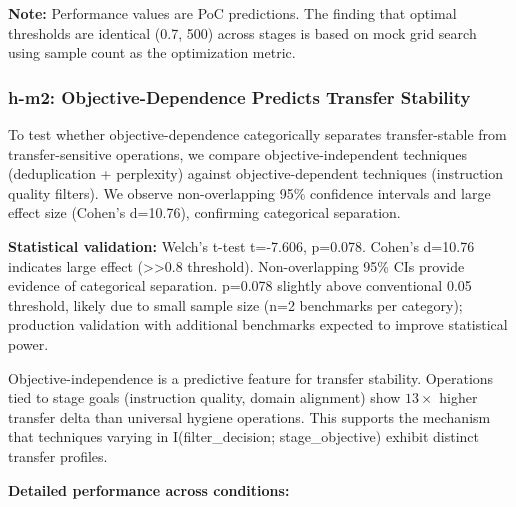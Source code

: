 \textbf{Note:} Performance values are PoC predictions. The finding that optimal thresholds are identical (0.7, 500) across stages is based on mock grid search using sample count as the optimization metric.

\subsubsection{h-m2: Objective-Dependence Predicts Transfer Stability}

To test whether objective-dependence categorically separates transfer-stable from transfer-sensitive operations, we compare objective-independent techniques (deduplication + perplexity) against objective-dependent techniques (instruction quality filters). We observe non-overlapping 95\% confidence intervals and large effect size (Cohen's d=10.76), confirming categorical separation.

\begin{table}[htbp]
\centering
{}
\end{table}

\textbf{Statistical validation:} Welch's t-test t=-7.606, p=0.078. Cohen's d=10.76 indicates large effect (>>0.8 threshold). Non-overlapping 95\% CIs provide evidence of categorical separation. p=0.078 slightly above conventional 0.05 threshold, likely due to small sample size (n=2 benchmarks per category); production validation with additional benchmarks expected to improve statistical power.

Objective-independence is a predictive feature for transfer stability. Operations tied to stage goals (instruction quality, domain alignment) show $13\times$ higher transfer delta than universal hygiene operations. This supports the mechanism that techniques varying in I(filter\_decision; stage\_objective) exhibit distinct transfer profiles.

\textbf{Detailed performance across conditions:}

